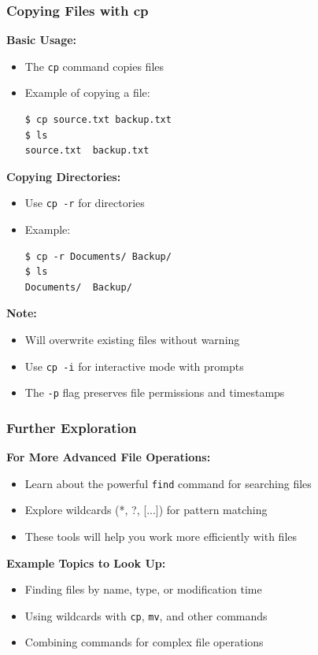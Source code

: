 \documentclass[10pt]{beamer}
\begin{document}
\begin{frame}[fragile]
    \frametitle{Copying Files with cp}
    
    \textbf{Basic Usage:}
    \begin{itemize}
        \item The \colorbox{gray!20}{\texttt{cp}} command copies files
        \item Example of copying a file:
\begin{verbatim}
$ cp source.txt backup.txt
$ ls
source.txt  backup.txt
\end{verbatim}
    \end{itemize}

    \textbf{Copying Directories:}
    \begin{itemize}
        \item Use \colorbox{gray!20}{\texttt{cp -r}} for directories
        \item Example:
\begin{verbatim}
$ cp -r Documents/ Backup/
$ ls
Documents/  Backup/
\end{verbatim}
    \end{itemize}

    \textbf{Note:}
    \begin{itemize}
        \item Will overwrite existing files without warning
        \item Use \texttt{cp -i} for interactive mode with prompts
        \item The \texttt{-p} flag preserves file permissions and timestamps
    \end{itemize}
\end{frame}

\begin{frame}[fragile]
    \frametitle{Further Exploration}
    
    \textbf{For More Advanced File Operations:}
    \begin{itemize}
        \item Learn about the powerful \colorbox{gray!20}{\texttt{find}} command for searching files
        \item Explore wildcards (*, ?, [...]) for pattern matching
        \item These tools will help you work more efficiently with files
    \end{itemize}

    \textbf{Example Topics to Look Up:}
    \begin{itemize}
        \item Finding files by name, type, or modification time
        \item Using wildcards with \texttt{cp}, \texttt{mv}, and other commands
        \item Combining commands for complex file operations
    \end{itemize}
\end{frame}
\end{document}
